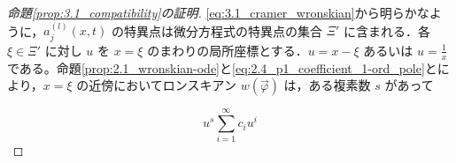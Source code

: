 \begin{proof}[命題\ref{prop:3.1_compatibility}の証明]
\eqref{eq:3.1_cramer_wronskian}から明らかなように，$a_j^{(l)}(x,t)$ の特異点は微分方程式の特異点の集合 $\Xi'$ に含まれる．各 $\xi \in \Xi'$ に対し $u$ を $x=\xi$ のまわりの局所座標とする．$u = x - \xi$ あるいは $u = \frac{1}{x}$ である。命題\ref{prop:2.1_wronskian-ode}と\eqref{eq:2.4_p1_coefficient_1-ord_pole}とにより，$x=\xi$ の近傍においてロンスキアン $w(\vec{\varphi})$ は，ある複素数 $s$ があって

\[
  u^s \sum_{i=1}^{\infty} c_i u^i
\]

\end{proof}

